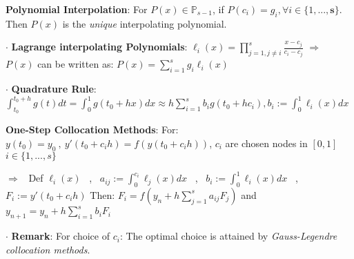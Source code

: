 \documentclass[9pt]{article}
\begin{document}
\textbf{Polynomial Interpolation}: For $P(x)\in\mathbb{P}_{s-1}$, if $P(c_i)=g_i,\forall i\in\{1,...,\mathbf{s}\}$. Then $P(x)$ is the \textit{unique} interpolating polynomial.

$\cdot$ \textbf{Lagrange interpolating Polynomials}: $\ell_{i}(x)=\prod\limits_{j=1,j\ne i}^{s}\frac{x-c_j}{c_i-c_j}$ \quad \quad $\Rightarrow$ $P(x)$ can be written as: $P(x)=\sum\limits_{i=1}^{s}g_i\ell_i(x)$

\vspace{-2pt}
$\cdot$ \textbf{Quadrature Rule}: {\small $\int^{t_0+h}_{t_0}g(t)dt=\int^1_0g(t_0+hx)dx\approx h\sum_{i=1}^{s}b_ig(t_0+hc_i),b_i:=\int^1_0\ell_i(x)dx$}  

\textbf{One-Step Collocation Methods}: For: $y(t_0)=y_0 \ , \ y'(t_0+c_ih)=f(y(t_0+c_ih))$, $c_i$ are chosen nodes in $[0,1]$ \ $i\in\{1,...,s\}$

{\small $\Rightarrow$ \ Def $\ell_i(x)$ \ , \ $a_{ij}:=\int_0^{c_i}\ell_j(x)dx$ \ , \ $b_i:=\int_0^1\ell_i(x)dx$ \ , \ $F_i:=y'(t_0+c_ih)$} \quad Then: $F_i=f(y_n+h\sum_{j=1}^{s}a_{ij}F_j)$ and $y_{n+1}=y_n+h\sum_{i=1}^{s}b_iF_i$

$\cdot$ \textbf{Remark}: {\footnotesize For choice of $c_i$: The optimal choice is attained by \textit{Gauss-Legendre collocation methods}}.
\end{document}
